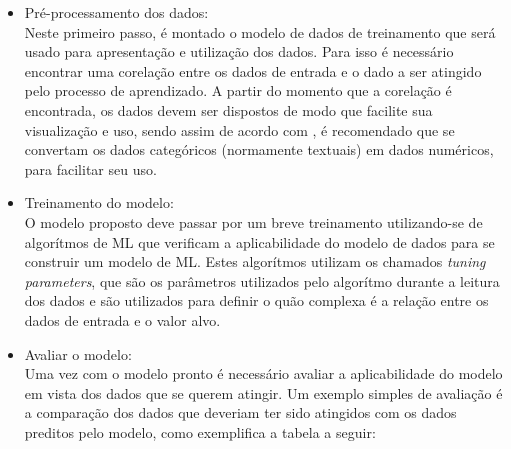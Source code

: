     \begin{itemize}
        \item Pré-processamento dos dados: \\ Neste primeiro passo, é montado o modelo de dados de treinamento que será usado para apresentação e utilização dos dados. Para isso é necessário encontrar uma corelação entre os dados de entrada e o dado a ser atingido pelo processo de aprendizado. A partir do momento que a corelação é encontrada, os dados devem ser dispostos de modo que facilite sua visualização e uso, sendo assim de acordo com \cite{brink2015}, é recomendado que se convertam os dados categóricos (normamente textuais) em dados numéricos, para facilitar seu uso.
        \item Treinamento do modelo: \\ O modelo proposto deve passar por um breve treinamento utilizando-se de algorítmos de ML que verificam a aplicabilidade do modelo de dados para se construir um modelo de ML. Estes algorítmos utilizam os chamados \textit{tuning parameters}, que são os parâmetros utilizados pelo algorítmo durante a leitura dos dados e são utilizados para definir o quão complexa é a relação entre os dados de entrada e o valor alvo. \cite{brink2015}
        \item Avaliar o modelo: \\ Uma vez com o modelo pronto é necessário avaliar a aplicabilidade do modelo em vista dos dados que se querem atingir. Um exemplo simples de avaliação é a comparação dos dados que deveriam ter sido atingidos com os dados preditos pelo modelo, como exemplifica a tabela a seguir:
        \newpage

        \begin{table}[]
            \centering
            \caption{Class-wise accuracy}
            \label{accuracy-table}
        \end{table}


\end{itemize}
